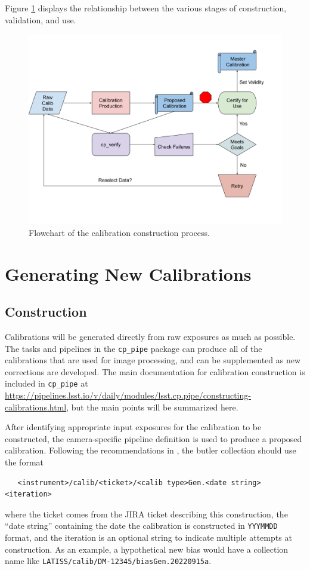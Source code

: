 \documentclass[DM,authoryear,toc]{lsstdoc}
\begin{document}
Figure \ref{fig:flowchart} displays the relationship between the various stages of construction, validation, and use.

\begin{figure}
  \includegraphics[width=\linewidth]{figures/flowchart.png}
  \caption{Flowchart of the calibration construction process.}
  \label{fig:flowchart}
\end{figure}


\section{Generating New Calibrations}

\subsection{Construction}

Calibrations will be generated directly from raw exposures as much as possible.  The tasks and pipelines in the \verb|cp_pipe| package can produce all of the calibrations that are used for image processing, and can be supplemented as new corrections are developed.  The main documentation for calibration construction is included in \verb|cp_pipe| at \url{https://pipelines.lsst.io/v/daily/modules/lsst.cp.pipe/constructing-calibrations.html}, but the main points will be summarized here.

After identifying appropriate input exposures for the calibration to be constructed, the camera-specific pipeline definition is used to produce a proposed calibration.  Following the recommendations in , the butler collection should use the format
\begin{verbatim}
   <instrument>/calib/<ticket>/<calib type>Gen.<date string><iteration>
\end{verbatim}
\noindent where the ticket comes from the JIRA ticket describing this construction, the ``date string'' containing the date the calibration is constructed in \verb|YYYMMDD| format, and the iteration is an optional string to indicate multiple attempts at construction.  As an example, a hypothetical new bias would have a collection name like \verb|LATISS/calib/DM-12345/biasGen.20220915a|.
\end{document}
